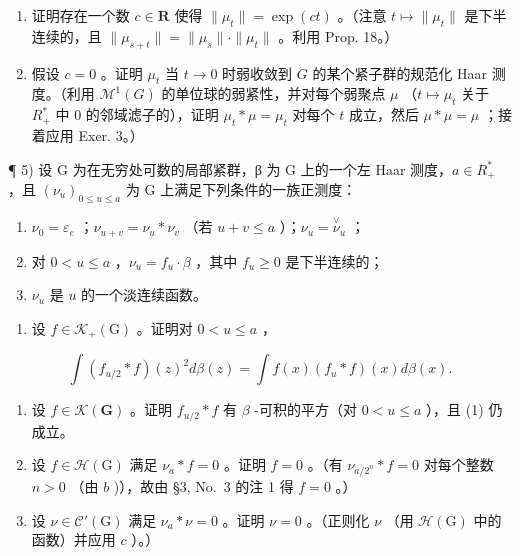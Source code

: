 \begin{enumerate}
\def\labelenumi{\alph{enumi})}
\item
  证明存在一个数 \(c \in \mathbf{R}\) 使得 \(\| \mu_t \| = \exp(ct)\) 。（注意 \(t \mapsto \| \mu_t \|\) 是下半连续的，且 \(\| \mu_{s+t} \| = \| \mu_s \| \cdot \| \mu_t \|\) 。利用 Prop. 18。）
\item
  假设 \(c = 0\) 。证明 \(\mu_t\) 当 \(t \to 0\) 时弱收敛到 \(G\) 的某个紧子群的规范化 Haar 测度。（利用 \(\mathcal{M}^1(G)\) 的单位球的弱紧性，并对每个弱聚点 \(\mu\) （\(t \mapsto \mu_t\) 关于 \(R_+^*\) 中 0 的邻域滤子的），证明 \(\mu_t * \mu = \mu_t\) 对每个 \(t\) 成立，然后 \(\mu * \mu = \mu\) ；接着应用 Exer. 3。）
\end{enumerate}

¶ 5) 设 G 为在无穷处可数的局部紧群，β 为 G 上的一个左 Haar 测度，\(a \in R_{+}^{*}\) ，且 \((\nu_{u})_{0 \leqslant u \leqslant a}\) 为 G 上满足下列条件的一族正测度：

\begin{enumerate}
\def\labelenumi{(\roman{enumi})}
\item
  \(\nu_0 = \varepsilon_e\) ；\(\nu_{u + v} = \nu_u * \nu_v\) （若 \(u + v \leqslant a\) ）；\(\nu_u = \stackrel{\vee}{\nu}_u\) ；
\item
  对 \(0 < u \leqslant a\) ，\(\nu_{u} = f_{u} \cdot \beta\) ，其中 \(f_{u} \geqslant 0\) 是下半连续的；
\item
  \(\nu_{u}\) 是 \(u\) 的一个淡连续函数。
\end{enumerate}

\begin{enumerate}
\def\labelenumi{\alph{enumi})}
\tightlist
\item
  设 \(f \in \mathcal{K}_{+}(\mathrm{G})\) 。证明对 \(0 < u \leqslant a\) ，
\end{enumerate}

\[
\int \left(f _ {u / 2} * f\right) (z) ^ {2} d \beta (z) = \int f (x) \left(f _ {u} * f\right) (x) d \beta (x).\tag{1}
\]

\begin{enumerate}
\def\labelenumi{\alph{enumi})}
\setcounter{enumi}{1}
\item
  设 \(f \in \mathcal{K}(\mathbf{G})\) 。证明 \(f_{u/2} * f\) 有 \(\beta\) -可积的平方（对 \(0 < u \leqslant a\) ），且 (1) 仍成立。
\item
  设 \(f \in \mathcal{H}(\mathrm{G})\) 满足 \(\nu_{a} * f = 0\) 。证明 \(f = 0\) 。（有 \(\nu_{a/2^n} * f = 0\) 对每个整数 \(n > 0\) （由 \(b\) )），故由 §3, No.~3 的注 1 得 \(f = 0\) 。）
\item
  设 \(\nu \in \mathcal{C}'(\mathrm{G})\) 满足 \(\nu_{a} * \nu = 0\) 。证明 \(\nu = 0\) 。（正则化 \(\nu\) （用 \(\mathcal{H}(\mathrm{G})\) 中的函数）并应用 \(c\) ）。）
\end{enumerate}

